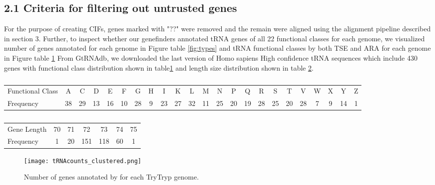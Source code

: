 \documentclass[table,
12pt, %
a4paper, %
oneside, %
headinclude,footinclude, %
BCOR5mm, %
]{scrartcl}
\begin{document}
\subsection{2.1 Criteria for filtering out untrusted genes}
For the purpose of creating CIFs, genes marked with "??" were removed and the remain were aligned using the alignment pipeline described in section 3. Further, to inspect whether our genefinders annotated tRNA genes of all 22 functional classes for
each genome, we visualized number of genes annotated for each genome in Figure
table \ref{fig:types} and tRNA functional classes by both TSE and ARA for each genome in Figure table \ref{fig:counts}
From GtRNAdb, we downloaded the last version of Homo sapiens High confidence tRNA sequences which include 430 genes with functional class distribution shown in table\ref{table:homo1} and length size distribution shown in table \ref{table:homo2}.
\begin{table}[htbp]
  \caption{}
  \begin{adjustbox}{width=15cm,center}
    \begin{tabular}{|l|c c c c c c c c c c c c c c c c c c c c c c|}
      \hline
      Functional Class & A  & C  & D  & E  & F  & G  & H & I  & K  & L  & M  & N  & P  & Q  & R  & S  & T  & V  & W & X & Y  & Z \\

      Frequency        & 38 & 29 & 13 & 16 & 10 & 28 & 9 & 23 & 27 & 32 & 11 & 25 & 20 & 19 & 28 & 25 & 20 & 28 & 7 & 9 & 14 & 1 \\
      \hline
    \end{tabular}
    \label{table:homo1}
  \end{adjustbox}
\end{table}


\begin{table}[htbp]
  \caption{}
  \begin{adjustbox}{width=7cm,center}
    \begin{tabular}{|l|c c c c c c|}
      \hline
      Gene Length & 70 & 71 & 72  & 73  & 74 & 75 \\
      Frequency   & 1  & 20 & 151 & 118 & 60 & 1  \\
      \hline
    \end{tabular}
    \label{table:homo2}
  \end{adjustbox}
\end{table}


\begin{figure}[tb]
  \centering
  \texttt{[image: tRNAcounts\_clustered.png]}
  \caption[Number of Genes annotated]{Number of genes annotated by for each TryTryp genome.} %
  \label{fig:counts}
\end{figure}
\end{document}
